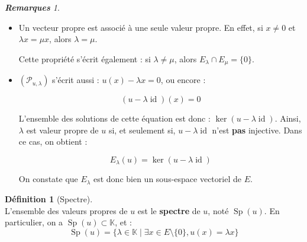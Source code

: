 \documentclass[12pt]{book}
\let\ensembleNombre\mathbb
\newcommand*\K{\ensuremath{\ensembleNombre{K}}}
\DeclareMathOperator{\id}{id}
\DeclareMathOperator{\Sp}{Sp}
\theoremstyle{definition}
\newtheorem*{defi}{Définition}
\theoremstyle{remark}
\newtheorem*{rems}{\textbf{Remarques}}
\newenvironment{fdef}
  {\begin{mdframed}[roundcorner=10pt, linewidth=1pt]\begin{defi}}
  {\end{defi}\end{mdframed}}
\begin{document}
	\begin{rems} \mbox{~} \\
		\begin{itemize}
		\item Un vecteur propre est associé à une seule valeur propre. En effet, si $x \neq 0$ et $\lambda x = \mu x$, alors $\lambda = \mu$.
		
		Cette propriété s'écrit également : si $\lambda \neq \mu$, alors $E_\lambda \cap E_\mu = \lbrace 0 \rbrace$.
		\item $(\mathcal P_{u,\lambda} )$ s'écrit aussi : $u(x) - \lambda x = 0$, ou encore :
		
		\[ \boxed{ (u - \lambda \id)(x) = 0 } \]
		
		L'ensemble des solutions de cette équation est donc : $\ker (u - \lambda \id)$. Ainsi, $\lambda$ est valeur propre de $u$ si, et seulement si, $u - \lambda\id$ n'est \textbf{pas} injective. Dans ce cas, on obtient :
		
		\[ \boxed{ E_\lambda(u) = \ker (u - \lambda\id) } \]
		
		On constate que $E_\lambda$ est donc bien un sous-espace vectoriel de $E$.
		\end{itemize}
	\end{rems}
	
	\begin{fdef}[Spectre] \mbox{~} \\
	L'ensemble des valeurs propres de $u$ est le \textbf{spectre} de $u$, noté $\Sp(u)$. En particulier, on a $\Sp(u) \subset \K$, et :
	\[\Sp(u) = \lbrace \lambda \in \K \;|\; \exists x \in E \setminus \lbrace 0 \rbrace, u(x) = \lambda x \rbrace\]
	\end{fdef}
	
\end{document}

